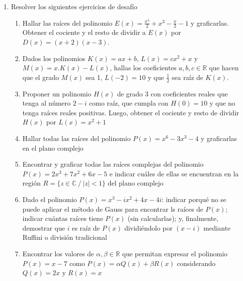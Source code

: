 \documentclass[a4paper]{article}
\newcommand{\exercise}{\item}
\newcommand{\df}[2]{\displaystyle\frac{#1}{#2}}
\begin{document}
\begin{enumerate}
\begin{enumerate} [label=(\alph*)]
		\item El \textit{factor de compresibilidad} de un gas ideal es $Z=1$. Sin embargo, en la vida real el coeficiente se puede expresar como un polinomio donde la variable es el volumen molar recíproco: $Z\left(\frac{1}{V_m}\right)=1+B\left(\frac{1}{V_m}\right)+C\left(\frac{1}{V_m}\right)^2+D\left(\frac{1}{V_m}\right)^3 + \cdots$. Los coeficientes $B$, $C$ y $D$ se denominan segundo, tercer y cuarto coeficiente virial, respectivamente. A la temperatura de 273 kelvin, los coeficientes del gas argón B y C son $-21.7$ (en $\frac{\text{cm}^3}{\text{mol}}$) y $1200$ (en $\frac{\text{cm}^6}{\text{mol}^2}$), respectivamente, y los demás se consideran despreciables (cero). Escribir el polinomio $Z\left(\frac{1}{V_m}\right)$ y calcular el \textit{factor de compresibilidad} de una muestra de gas argón que presenta un volúmen molar de $540~\frac{\text{cm}^3}{\text{mol}}$ a 273 kelvin.
	\end{enumerate}
	\exercise Resolver los siguientes ejercicios de desafío
	\begin{enumerate} [label=(\alph*)]
		\item Hallar las raíces del polinomio $E(x)=\df{x^4}{2}+x^3-\df{x}{2}-1$ y graficarlas. Obtener el cociente y el resto de dividir a $E(x)$ por $D(x)=(x+2)(x-3)$.
		\item Dados los polinomios $K(x)=ax+b$, $L(x)=cx^2+x$ y $M(x)=x.K(x)-L(x)$, hallas los coeficientes $a,b,c \in \mathbb{R}$ que hacen que el grado $M(x)$ sea 1, $L(-2)=10$ y que $\df{1}{2}$ sea raíz de $K(x)$.
		\item Proponer un polinomio $H(x)$ de grado 3 con coeficientes reales que tenga al número $2-i$ como raíz, que cumpla con $H(0)=10$ y que no tenga raíces reales positivas. Luego, obtener el cociente y resto de dividir $H(x)$ por $L(x)=x^2+1$
		\item Hallar todas las raíces del polinomio $P(x)=x^6-3x^3-4$ y graficarlas en el plano complejo
		\item Encontrar y graficar todas las raíces complejas del polinomio $P(x)=2x^3+7x^2+6x-5$ e indicar cuáles de ellas se encuentran en la región $R=\{ z \in \mathbb{C} ~/~ |z|<1 \}$ del plano complejo
		\item Dado el polinomio $P(x)=x^3-ix^2+4x-4i$: indicar porqué no se puede aplicar el método de Gauss para encontrar ls raíces de $P(x)$; indicar cuántas raíces tiene $P(x)$ (sin calcularlas); y, finalmente, demostrar que $i$ es raíz de $P(x)$ dividiéndolo por $(x-i)$ mediante Ruffini o división tradicional
		\item Encontrar los valores de $\alpha, \beta \in \mathbb{R}$ que permitan expresar el polinomio $P(x)=x-7$ como $P(x)=\alpha Q(x)+\beta R(x)$ considerando $Q(x)=2x$ y $R(x)=x$
	\end{enumerate}
\end{enumerate}
\end{document}
